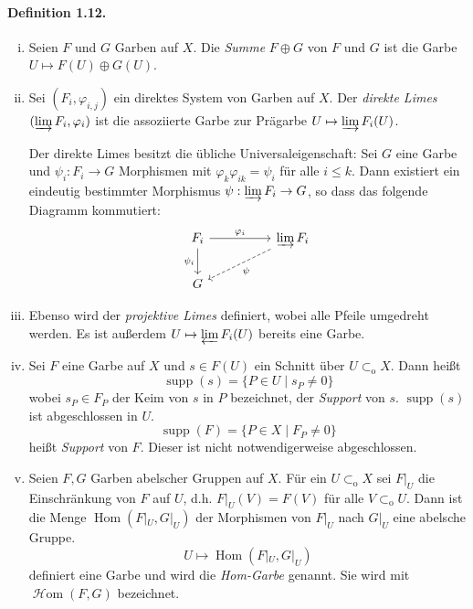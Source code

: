 \paragraph{Definition 1.12.}\label{1.12} \begin{enumerate}[(i)]
\item Seien $F$ und $G$ Garben auf $X$. Die \textit{Summe} $F\oplus G$ von $F$ und $G$ ist die Garbe $U\mapsto F(U)\oplus G(U)$.
\item Sei $(F_i,\varphi_{i,j})$ ein direktes System von Garben auf $X$. Der \textit{direkte Limes} $(\varinjlim F_i,\varphi_i)$ ist die assoziierte Garbe zur Prägarbe $U\mapsto \varinjlim F_i(U)$.

Der direkte Limes besitzt die übliche Universaleigenschaft: Sei $G$ eine Garbe und $\psi_i:F_i\to G$ Morphismen mit $\varphi_k\varphi_{ik}=\psi_i$ für alle $i\leq k$. Dann existiert ein eindeutig bestimmter Morphismus $\psi:\varinjlim F_i\to G$, so dass das folgende Diagramm kommutiert:
\[\begin{tikzcd}
F_i\ar[rr, "\varphi_i"]\ar[d, "\psi_i"'] & & \varinjlim F_i\ar[lld, "\psi", dashed]\\
G
\end{tikzcd} \]
\item Ebenso wird der \textit{projektive Limes} definiert, wobei alle Pfeile umgedreht werden. Es ist außerdem $U\mapsto\varprojlim F_i(U)$ bereits eine Garbe.
\item Sei $F$ eine Garbe auf $X$ und $s\in F(U)$ ein Schnitt über $U\subset_\text{o}X$. Dann heißt
\[\operatorname{supp}(s)=\{P\in U\mid s_P\neq 0\} \]
wobei $s_P\in F_P$ der Keim von $s$ in $P$ bezeichnet, der \textit{Support} von $s$. $\operatorname{supp}(s)$ ist abgeschlossen in $U$.
\[\operatorname{supp}(F)=\{P\in X\mid F_P\neq 0\} \]
heißt \textit{Support} von $F$. Dieser ist nicht notwendigerweise abgeschlossen.
\item Seien $F,G$ Garben abelscher Gruppen auf $X$. Für ein $U\subset_\text{o}X$ sei $F|_U$ die Einschränkung von $F$ auf $U$, d.h. $F|_U(V)=F(V)$ für alle $V\subset_\text{o}U$. Dann ist die Menge $\operatorname{Hom}(F|_U,G|_U)$ der Morphismen von $F|_U$ nach $G|_U$ eine abelsche Gruppe.
\[U\mapsto\operatorname{Hom}(F|_U,G|_U)\]
definiert eine Garbe und wird die \textit{Hom-Garbe} genannt. Sie wird mit $\operatorname{\mathcal{H}om}(F,G)$ bezeichnet.
\end{enumerate}

